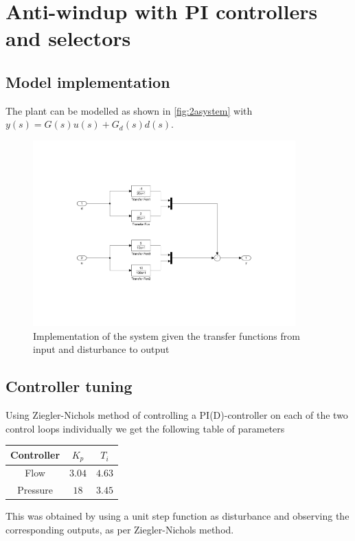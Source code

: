 \documentclass[a4paper]{scrartcl}
\begin{document}
\clearpage
\section{Anti-windup with PI controllers and selectors}
\subsection{Model implementation}
The plant can be modelled as shown in \autoref{fig:2asystem} with $y(s) = G(s)u(s) + G_d(s)d(s)$.
\begin{figure}[ht!]
	\centering
	\includegraphics[width=0.9\textwidth]{fig/simulink/system.pdf}
	\caption{Implementation of the system given the transfer functions from input and disturbance to output}
	\label{fig:2asystem}
\end{figure}

\subsection{Controller tuning}
Using Ziegler-Nichols method of controlling a PI(D)-controller on each of the two control loops individually we get the following table of parameters

\begin{center}
	\begin{tabular}{c|c|c}
		Controller & $K_p$ & $T_i$ \\
		\hline
		Flow & $3.04$ & $4.63$\\
		Pressure & $18$ & $3.45$
	\end{tabular}
\end{center}
This was obtained by using a unit step function as disturbance and observing the corresponding outputs, as per Ziegler-Nichols method.
\end{document}
